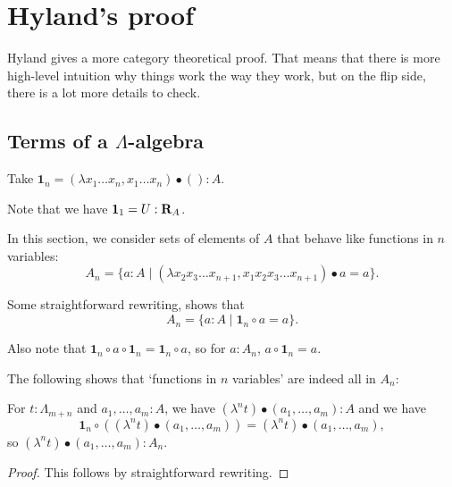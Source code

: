 \section{Hyland's proof}

Hyland gives a more category theoretical proof. That means that there is more high-level intuition why things work the way they work, but on the flip side, there is a lot more details to check.

\subsection{Terms of a \texorpdfstring{$ \Lambda $}{Lambda}-algebra}

\begin{definition}
  Take $ \mathbf 1_n = (\lambda x_1 \dots x_n, x_1 \dots x_n) \bullet () : A $.
\end{definition}

\begin{remark}
  Note that we have $ \mathbf 1_1 = U : \mathbf{R}_A $.
\end{remark}

\begin{definition}
  In this section, we consider sets of elements of $ A $ that behave like functions in $ n $ variables:
  \[ A_n = \{ a : A \mid (\lambda x_2 x_3 \dots x_{n + 1}, x_1 x_2 x_3 \dots x_{n + 1}) \bullet a = a \}. \]
\end{definition}

\begin{remark}
  Some straightforward rewriting, shows that
  \[ A_n = \{ a : A \mid \mathbf 1_n \circ a = a \}. \]
\end{remark}

\begin{remark}
  Also note that $ \mathbf 1_n \circ a \circ \mathbf 1_n = \mathbf 1_n \circ a $, so for $ a : A_n $, $ a \circ \mathbf 1_n = a $.
\end{remark}

The following shows that `functions in $ n $ variables' are indeed all in $ A_n $:
\begin{lemma}
  For $ t: \Lambda_{m + n} $ and $ a_1, \dots, a_m: A $, we have $ (\lambda^n t) \bullet (a_1, \dots, a_m) : A $ and we have
  \[ \mathbf 1_n \circ ((\lambda^n t) \bullet (a_1, \dots, a_m)) = (\lambda^n t) \bullet (a_1, \dots, a_m), \]
  so $ (\lambda^n t) \bullet (a_1, \dots, a_m) : A_n $.
\end{lemma}
\begin{proof}
  This follows by straightforward rewriting.
\end{proof}

